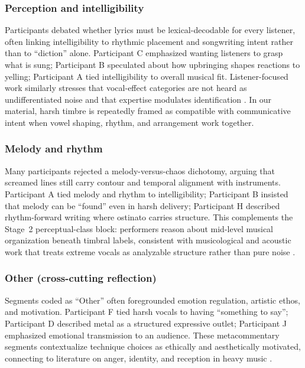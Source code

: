 \documentclass{article}
\begin{document}
\subsubsection{Perception and intelligibility}
Participants debated whether lyrics must be lexical-decodable for every listener, often linking intelligibility to rhythmic placement and songwriting intent rather than to ``diction'' alone.
Participant C emphasized wanting listeners to grasp what is sung; Participant B speculated about how upbringing shapes reactions to yelling; Participant A tied intelligibility to overall musical fit.
Listener-focused work similarly stresses that vocal-effect categories are not heard as undifferentiated noise and that expertise modulates identification \parencite{Pinto2023VocalEffects}.
In our material, harsh timbre is repeatedly framed as compatible with communicative intent when vowel shaping, rhythm, and arrangement work together.

\subsubsection{Melody and rhythm}
Many participants rejected a melody-versus-chaos dichotomy, arguing that screamed lines still carry contour and temporal alignment with instruments.
Participant A tied melody and rhythm to intelligibility; Participant B insisted that melody can be ``found'' even in harsh delivery; Participant H described rhythm-forward writing where ostinato carries structure.
This complements the Stage~2 perceptual-class block: performers reason about mid-level musical organization beneath timbral labels, consistent with musicological and acoustic work that treats extreme vocals as analyzable structure rather than pure noise \parencite{Smialek2012Spectrographic,Tailleur2021AcousticSpace}.

\subsubsection{Other (cross-cutting reflection)}
Segments coded as ``Other'' often foregrounded emotion regulation, artistic ethos, and motivation.
Participant F tied harsh vocals to having ``something to say''; Participant D described metal as a structured expressive outlet; Participant J emphasized emotional transmission to an audience.
These metacommentary segments contextualize technique choices as ethically and aesthetically motivated, connecting to literature on anger, identity, and reception in heavy music \parencite{Sharman2015AngerProcessing,Wallmark2018SoundOfEvil}.
\end{document}
